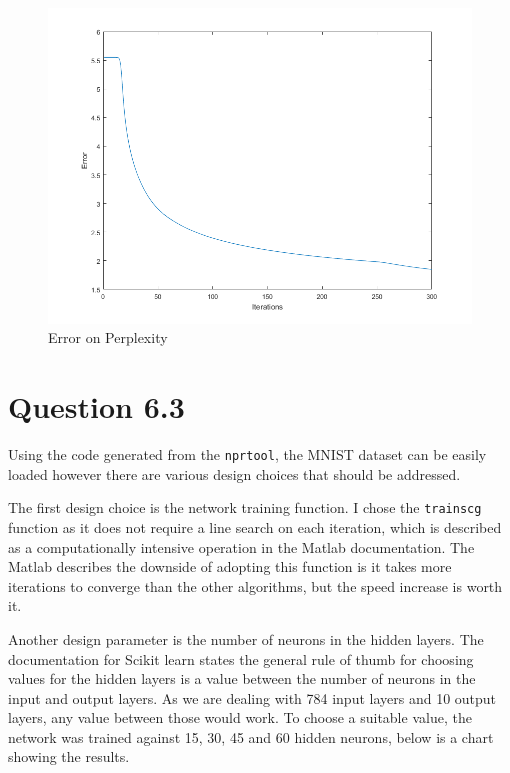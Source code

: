 \begin{figure}[H]
    \includegraphics[width=\linewidth]{../../pracs/week6/images/q8_p2}
    \centering
    \caption{Error on Perplexity}
\end{figure}

\section*{Question 6.3}

Using the code generated from the \verb|nprtool|, the MNIST dataset can be easily loaded however there are various design choices that should be addressed.

The first design choice is the network training function.
I chose the \verb|trainscg| function as it does not require a line search on each iteration,
which is described as a computationally intensive operation in the Matlab documentation.
The Matlab describes the downside of adopting this function is it takes more iterations to converge than the other algorithms,
but the speed increase is worth it.

Another design parameter is the number of neurons in the hidden layers.
The documentation for Scikit learn states the general rule of thumb for choosing values for the hidden layers is a value between the number of neurons in the input and output layers.
As we are dealing with 784 input layers and 10 output layers, any value between those would work.
To choose a suitable value, the network was trained against 15, 30, 45 and 60 hidden neurons, below is a chart showing the results.

